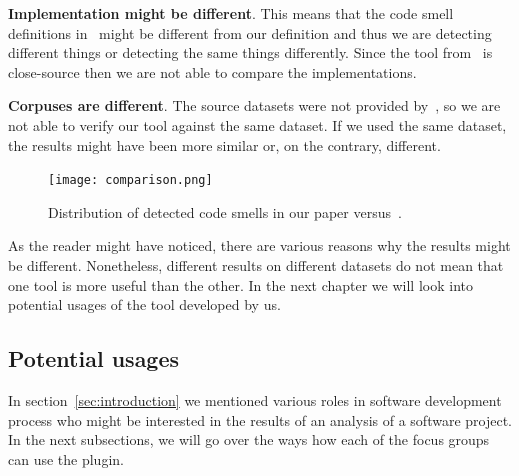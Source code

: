 \begin{flushleft}
    \textbf{Implementation might be different}.
    This means that the code smell definitions in~\cite{mannan2016understanding} might be different from our definition and
    thus we are detecting different things or detecting the same things differently.
    Since the tool from~\cite{mannan2016understanding} is close-source then we are not able to compare the implementations.
\end{flushleft}

\begin{flushleft}
    \textbf{Corpuses are different}.
    The source datasets were not provided by~\citeauthor{mannan2016understanding}, so we are not able to verify our tool against
    the same dataset.
    If we used the same dataset, the results might have been more similar or, on the contrary, different.
\end{flushleft}

\begin{figure} [htb]
    \texttt{[image: comparison.png]}
    \caption{Distribution of detected code smells in our paper versus~\cite{mannan2016understanding}.}
    \label{fig:comparison_of_distributions}
\end{figure}

As the reader might have noticed, there are various reasons why the results might be different.
Nonetheless, different results on different datasets do not mean that one tool is more useful than the other.
In the next chapter we will look into potential usages of the tool developed by us.

\FloatBarrier

\subsection{Potential usages}\label{subsec:potential-usages}


In section~\ref{sec:introduction} we mentioned various roles in software development process who might be interested
in the results of an analysis of a software project.
In the next subsections, we will go over the ways how each of the focus groups can use the plugin.

